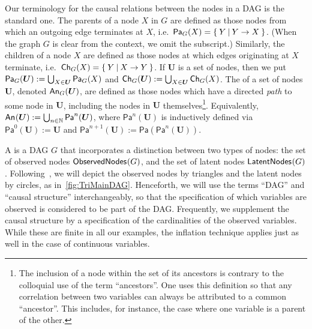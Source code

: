 \documentclass[aps,english,superscriptaddress,onecolumn,twoside,longbibliography,pra,floatfix,fleqn,nofootinbib]{revtex4-1}%
\newcommand*{\tblue}[1]{{\color{MidnightBlue}{\textbf{#1}}}}
\theoremstyle{definition}
\newcounter{example}[section]
\newcommand{\An}[2][]{{\mathsf{An}_{#1}}\parenths{#2}}
\newcommand{\Pa}[2][]{{\mathsf{Pa}_{#1}}\parenths{#2}}
\newcommand{\Ch}[2][]{{\mathsf{Ch}_{#1}}\parenths{#2}}
\newcommand{\SmallNamedFunction}[3][]{\operatorname{\mathsf{#2}}_{#1}\parenths{#3}}
\newcommand{\obsnodes}[1]{\SmallNamedFunction{ObservedNodes}{#1}}
\newcommand{\latnodes}[1]{\SmallNamedFunction{LatentNodes}{#1}}
\DeclarePairedDelimiter{\parenths}{\lparen}{\rparen}
\begin{document}
Our terminology for the causal relations between the nodes in a DAG is the standard one. The parents of a node $X$ in $G$ are defined as those nodes from which an outgoing edge terminates at $X$, i.e.~$\Pa[G]{X} = \{\:Y\:|\:Y\to X\:\}$. (When the graph $G$ is clear from the context, we omit the subscript.) Similarly, the children of a node $X$ are defined as those nodes at which edges originating at $X$ terminate, i.e.~$\Ch[G]{X} = \{\:Y\:|\: X\to Y\:\}$. If $\bm{U}$ is a set of nodes, then we put $\Pa[G]{\bm{U}} := \bigcup_{X\in\bm{U}} \Pa[G]{X}$ and $\Ch[G]{\bm{U}} := \bigcup_{X\in\bm{U}} \Ch[G]{X}$. The \tblue{ancestors} of a set of nodes $\bm{U}$, denoted $\An[G]{\bm{U}}$, are defined as those nodes which have a directed \emph{path} to some node in $\bm{U}$, including the nodes in $\bm{U}$ themselves\footnote{The inclusion of a node within the set of its ancestors is contrary to the colloquial use of the term ``ancestors''. 
One uses this definition so that any correlation between two variables can always be attributed to a common ``ancestor''. This includes, for instance, the case where one variable is a parent of the other.
}. 
Equivalently, $\An{\bm{U}} := \bigcup_{n\in\mathbb{N}} \mathsf{Pa}^n(\bm{U})$, where $\mathsf{Pa}^n(\bm{U})$ is inductively defined via $\mathsf{Pa}^0(\bm{U}) := \bm{U}$ and $\mathsf{Pa}^{n+1}(\bm{U}) := \mathsf{Pa}(\mathsf{Pa}^n(\bm{U}))$. 

A \tblue{causal structure} is a DAG $G$ that incorporates a distinction between two types of nodes: the set of observed nodes $\obsnodes{G}$, and the set of latent nodes $\latnodes{G}$.  
Following~\cite{pusey2014gdag}, we will depict the observed nodes by triangles and the latent nodes by circles, as in~\cref{fig:TriMainDAG}.
Henceforth, we will use the terms ``DAG'' and ``causal structure'' interchangeably, so that the specification of which variables are observed is considered to be part of the DAG.
Frequently, we supplement the causal structure by a specification of the cardinalities of the observed variables. While these are finite in all our examples, the inflation technique applies just as well in the case of continuous variables.
\end{document}
